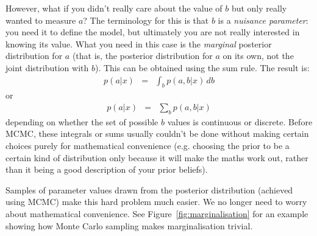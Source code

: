 However, what if you didn't really care about the value of $b$ but
only really wanted to measure $a$? The terminology for this is that $b$ is a
{\it nuisance parameter}: you need it to define the model, but ultimately you
are not really interested in knowing its value.
What you need in this case is the
{\it marginal} posterior distribution for $a$ (that is, the posterior
distribution for $a$ on its own, not the joint distribution with $b$).
This can be obtained using the sum rule. The result is:
\begin{eqnarray}
p(a | x) &=& \int_b p(a, b|x) \, db
\end{eqnarray}
or
\begin{eqnarray}
p(a | x) &=& \sum_{b} p(a, b|x)
\end{eqnarray}
depending on whether the set of possible $b$ values is continuous or discrete.
Before MCMC, these integrals or sums usually couldn't be done without making
certain choices purely for mathematical convenience (e.g. choosing the prior
to be a certain kind of distribution only because it will make the maths work
out, rather than it being a good description of your prior beliefs).

Samples of parameter values drawn from the posterior distribution
(achieved using MCMC) make this hard problem much easier. We no longer need
to worry about mathematical convenience.
See Figure~\ref{fig:marginalisation} for an example showing how Monte Carlo
sampling makes marginalisation trivial.


